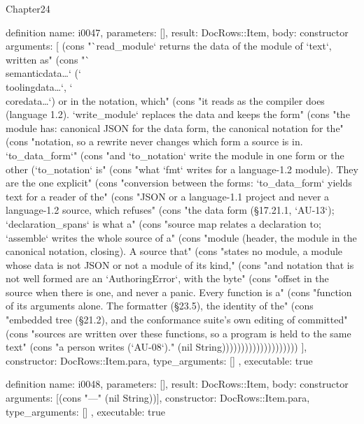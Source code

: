 \begin{lexlean}{Chapter24}
\begin{semanticmodule}
definition{
  name: i0047,
  parameters: [],
  result: DocRows::Item,
  body: constructor{
    arguments: [
      (cons "`read_module` returns the data of the module of `text`, written as" (cons "`\\semanticdata{…}` (`\\toolingdata{…}`, `\\coredata{…}`) or in the notation, which" (cons "it reads as the compiler does (language 1.2). `write_module` replaces the data and keeps the form" (cons "the module has: canonical JSON for the data form, the canonical notation for the" (cons "notation, so a rewrite never changes which form a source is in. `to_data_form`" (cons "and `to_notation` write the module in one form or the other (`to_notation` is" (cons "what `fmt` writes for a language-1.2 module). They are the one explicit" (cons "conversion between the forms: `to_data_form` yields text for a reader of the" (cons "JSON or a language-1.1 project and never a language-1.2 source, which refuses" (cons "the data form (§17.21.1, `AU-13`); `declaration_spans` is what a" (cons "source map relates a declaration to; `assemble` writes the whole source of a" (cons "module (header, the module in the canonical notation, closing). A source that" (cons "states no module, a module whose data is not JSON or not a module of its kind," (cons "and notation that is not well formed are an `AuthoringError`, with the byte" (cons "offset in the source when there is one, and never a panic. Every function is a" (cons "function of its arguments alone. The formatter (§23.5), the identity of the" (cons "embedded tree (§21.2), and the conformance suite's own editing of committed" (cons "sources are written over these functions, so a program is held to the same text" (cons "a person writes (`AU-08`)." (nil String))))))))))))))))))))
    ],
    constructor: DocRows::Item.para,
    type_arguments: []
  },
  executable: true
}

definition{
  name: i0048,
  parameters: [],
  result: DocRows::Item,
  body: constructor{
    arguments: [(cons "---" (nil String))],
    constructor: DocRows::Item.para,
    type_arguments: []
  },
  executable: true
}
\end{semanticmodule}
\end{lexlean}
